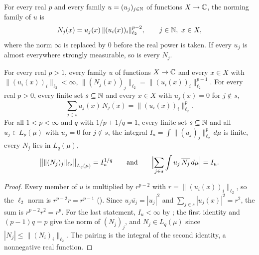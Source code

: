 \begin{definition}
\label{def:norming-family}
\leanok
{}
For every real $p$ and every family $u = (u_j)_{j \in \mathbb{N}}$ of functions $X \to \mathbb{C}$, the
norming family of $u$ is
\[
  N_j(x) = u_j(x) \, \|(u_i(x))_i\|_{\ell_2}^{p-2} , \qquad j \in \mathbb{N}, \ x \in X,
\]
where the norm $\infty$ is replaced by $0$ before the real power is taken. If every $u_j$ is
almost everywhere strongly measurable, so is every $N_j$.
\end{definition}

\begin{lemma}
\label{lem:norming-family}
\leanok
{}
For every real $p > 1$, every family $u$ of functions $X \to \mathbb{C}$ and every $x \in X$ with
$\|(u_i(x))_i\|_{\ell_2} < \infty$,
$\|(N_j(x))_j\|_{\ell_2} = \|(u_i(x))_i\|_{\ell_2}^{p-1}$. For every real $p > 0$, every finite
set $s \subseteq \mathbb{N}$ and every $x \in X$ with $u_j(x) = 0$ for $j \notin s$,
\[
  \sum_{j \in s} u_j(x) \, \overline{N_j(x)} = \|(u_i(x))_i\|_{\ell_2}^p .
\]
For all $1 < p < \infty$ and $q$ with $1/p + 1/q = 1$, every finite set $s \subseteq \mathbb{N}$ and all
$u_j \in L_p(\mu)$ with $u_j = 0$ for $j \notin s$, the integral
$I_u = \int \|(u_j)_j\|_{\ell_2}^p \, d\mu$ is finite, every $N_j$ lies in $L_q(\mu)$,
\[
  \bigl\| \|(N_j)_j\|_{\ell_2} \bigr\|_{L_q(\mu)} = I_u^{1/q} \qquad\text{and}\qquad
  \Bigl| \sum_{j \in s} \int u_j \, \overline{N_j} \, d\mu \Bigr| = I_u .
\]
\end{lemma}

\begin{proof}
\leanok
Every member of $u$ is multiplied by $r^{p-2}$ with $r = \|(u_i(x))_i\|_{\ell_2}$, so the
$\ell_2$ norm is $r^{p-2} r = r^{p-1}$ (). Since
$u_j \overline{u_j} = |u_j|^2$ and $\sum_{j \in s} |u_j(x)|^2 = r^2$, the sum is
$r^{p-2} r^2 = r^p$. For the last statement, $I_u < \infty$ by ;
the first identity and $(p - 1) q = p$ give the norm of $(N_j)_j$, and $N_j \in L_q(\mu)$ since
$|N_j| \leq \|(N_i)_i\|_{\ell_2}$. The pairing is the integral of the second identity, a
nonnegative real function.
\end{proof}

